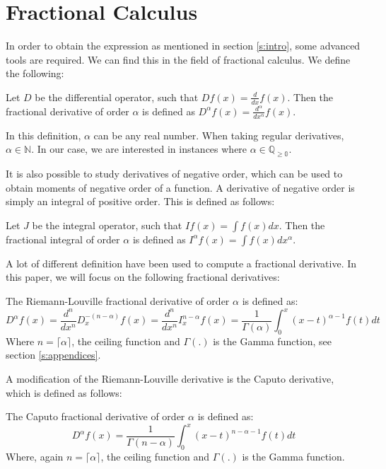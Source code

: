 \section{Fractional Calculus}\label{s:calculus}
In order to obtain the expression as mentioned in section \ref{s:intro}, some advanced tools are required. We can find this in the field of fractional calculus.
We define the following:
\begin{definition}
    Let \(D\) be the differential operator, such that \(D f(x) = \frac{d}{dx} f(x)\). Then the fractional derivative of order \(\alpha\) is defined as \(D^{\alpha} f(x) = \frac{d^{\alpha}}{dx^{\alpha}} f(x)\).
\end{definition}
In this definition, \(\alpha\) can be any real number. When taking regular derivatives, \(\alpha \in \mathbb{N}\). In our case, we are interested in instances where  \(\alpha \in \mathbb{Q_{\geq 0}}\).

It is also possible to study derivatives of negative order, which can be used to obtain moments of negative order of a function. A derivative of negative order is simply an integral of positive order. This is defined as follows:
\begin{definition}
    Let \(J\) be the integral operator, such that \(I f(x) = \int f(x) dx\). Then the fractional integral of order \(\alpha\) is defined as \(I^{\alpha} f(x) = \int f(x) dx^{\alpha}\).
\end{definition}

A lot of different definition have been used to compute a fractional derivative. In this paper, we will focus on the following fractional derivatives:
\begin{definition}
    The Riemann-Louville fractional derivative of order \(\alpha\) is defined as:
    \begin{equation}
        D^{\alpha} f(x) =  \frac{d^{n}}{dx^{n}} D_{x}^{-(n - \alpha)} f(x) = \frac{d^{n}}{dx^{n}} I_{x}^{n - \alpha} f(x) = \frac{1}{\Gamma(\alpha)}  \int_{0}^{x} (x-t)^{\alpha-1} f(t) dt
    \end{equation}
    Where \(n = \lceil \alpha \rceil\), the ceiling function and \(\Gamma(.)\) is the Gamma function, see section \ref{s:appendices}.
   
\end{definition}
A modification of the Riemann-Louville derivative is the Caputo derivative, which is defined as follows:
\begin{definition}
    The Caputo fractional derivative of order \(\alpha\) is defined as:
    \begin{equation}
        D^{\alpha} f(x) = \frac{1}{\Gamma(n-\alpha)}  \int_{0}^{x} (x-t)^{n-\alpha-1} f(t) dt
    \end{equation}
    Where, again \(n = \lceil \alpha \rceil\), the ceiling function and \(\Gamma(.)\) is the Gamma function.
    
\end{definition}

